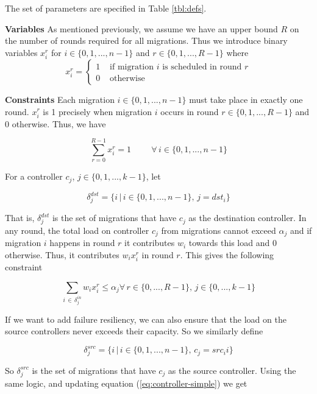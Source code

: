 \documentclass[conference]{IEEEtran}
\begin{document}
The set of parameters are specified in Table \ref{tbl:defs}.

\noindent\textbf{Variables}
\noindent As mentioned previously, we assume we have an upper bound $R$ on the number of rounds required for all migrations. Thus we introduce binary variables $x^{r}_{i}$ for $i \in \{0, 1, ..., n - 1\}$ and $r \in \{0, 1, ..., R - 1\}$ where
\[
    x^{r}_{i} =
    \begin{cases}
        1 &\text{ if migration } i \text { is scheduled in round } r \\
        0 &\text{ otherwise}
    \end{cases}
\]

\noindent\textbf{Constraints}
\noindent Each migration $i \in \{0, 1, ..., n - 1\}$ must take place in exactly one round. $x^{r}_{i}$ is 1 precisely when migration $i$ occurs in round $r \in \{0, 1, ..., R-1\}$ and 0 otherwise. Thus, we have

\begin{equation}\label{eq:single-migration}
    \sum_{r=0}^{R-1} x^{r}_{i} = 1 \hspace{1cm} \forall \, i \in \{0, 1, ..., n - 1\}
\end{equation}

\noindent For a controller $c_{j}$, $j \in \{0, 1, ..., k - 1\}$, let 

$$\delta^{dst}_{j} = \{i \, | \, i \in \{0, 1, ..., n-1\}, \, j = dst_{i}\}$$

That is, $\delta^{dst}_{j}$ is the set of migrations that have $c_{j}$ as the destination controller. In any round, the total load on controller $c_{j}$ from migrations cannot exceed $\alpha_{j}$ and if migration $i$ happens in round $r$ it contributes $w_{i}$ towards this load and 0 otherwise. Thus, it contributes $w_{i}x^{r}_{i}$ in round $r$. This gives the following constraint

\begin{equation}\label{eq:controller-simple}
    \sum_{i \, \in \, \delta^{in}_{j}} w_{i}x^{r}_{i} \leq \alpha_{j} \forall \, r \in \{0, ..., R-1\}, \, j \in \{0, ..., k-1\}
\end{equation}

If we want to add failure resiliency, we can also ensure that the load on the source controllers never exceeds their capacity. So we similarly define

$$\delta^{src}_{j} = \{i \, | \, i \in \{0, 1, ..., n-1\}, \, c_{j} = src_{i} i\}$$

So $\delta^{src}_{j}$ is the set of migrations that have $c_{j}$ as the source controller. Using the same logic, and updating equation (\ref{eq:controller-simple}) we get
\end{document}
